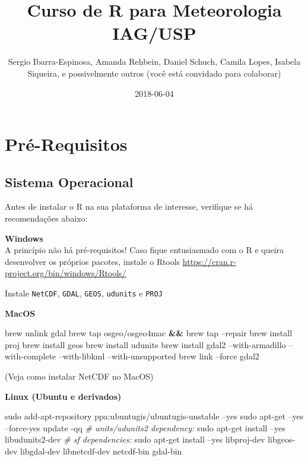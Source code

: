 \documentclass[]{book}
\title{Curso de R para Meteorologia IAG/USP}
\author{Sergio Ibarra-Espinosa, Amanda Rehbein, Daniel Schuch, Camila Lopes,
Isabela Siqueira, e possivelmente outros (você está convidado para
colaborar)}
\date{2018-06-04}
\newenvironment{Shaded}{\begin{snugshade}}{\end{snugshade}}
\newcommand{\KeywordTok}[1]{\textcolor[rgb]{0.13,0.29,0.53}{\textbf{#1}}}
\newcommand{\CommentTok}[1]{\textcolor[rgb]{0.56,0.35,0.01}{\textit{#1}}}
\newcommand{\FunctionTok}[1]{\textcolor[rgb]{0.00,0.00,0.00}{#1}}
\newcommand{\ExtensionTok}[1]{#1}
\newcommand{\NormalTok}[1]{#1}
\theoremstyle{definition}
\theoremstyle{definition}
\theoremstyle{definition}
\theoremstyle{remark}
\begin{document}
\maketitle

{
\setcounter{tocdepth}{1}
\tableofcontents
}
\chapter{Pré-Requisitos}\label{primero}

\section{Sistema Operacional}\label{sistema-operacional}

Antes de instalar o R na sua plataforma de interesse, verifique se há
recomendações abaixo:

\textbf{Windows}\\
A princípio não há pré-requisitos! Caso fique entusiasmado com o R e
queira desenvolver os próprios pacotes, instale o Rtools
\url{https://cran.r-project.org/bin/windows/Rtools/}

Instale \texttt{NetCDF}, \texttt{GDAL}, \texttt{GEOS}, \texttt{udunits}
e \texttt{PROJ}

\textbf{MacOS}

\begin{Shaded}
\begin{Highlighting}[]
\ExtensionTok{brew}\NormalTok{ unlink gdal}
\ExtensionTok{brew}\NormalTok{ tap osgeo/osgeo4mac }\KeywordTok{&&} \ExtensionTok{brew}\NormalTok{ tap --repair}
\ExtensionTok{brew}\NormalTok{ install proj}
\ExtensionTok{brew}\NormalTok{ install geos}
\ExtensionTok{brew}\NormalTok{ install udunits}
\ExtensionTok{brew}\NormalTok{ install gdal2 --with-armadillo --with-complete --with-libkml --with-unsupported}
\ExtensionTok{brew}\NormalTok{ link --force gdal2}
\end{Highlighting}
\end{Shaded}

(Veja como instalar NetCDF no MacOS)

\textbf{Linux (Ubuntu e derivados)}

\begin{Shaded}
\begin{Highlighting}[]
\FunctionTok{sudo}\NormalTok{ add-apt-repository ppa:ubuntugis/ubuntugis-unstable --yes}
\FunctionTok{sudo}\NormalTok{ apt-get --yes --force-yes update -qq}
\CommentTok{# units/udunits2 dependency:}
\FunctionTok{sudo}\NormalTok{ apt-get install --yes libudunits2-dev}
\CommentTok{# sf dependencies:}
\FunctionTok{sudo}\NormalTok{ apt-get install --yes libproj-dev libgeos-dev libgdal-dev libnetcdf-dev  netcdf-bin gdal-bin}
\end{Highlighting}
\end{Shaded}
\end{document}
